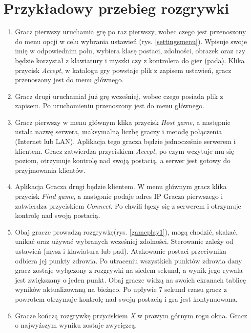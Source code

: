 \documentclass[multip]{SGGW-thesis}
\begin{document}
\chapter{Przykładowy przebieg rozgrywki} %

\begin{enumerate}
	\item Gracz pierwszy uruchamia grę po raz pierwszy, wobec czego jest przenoszony do menu opcji w celu wybrania ustawień (rys. \ref{settingsmenu}). Wpisuje swoje imię w odpowiednim polu, wybiera klasę postaci, zdolności, obrazek oraz czy będzie korzystał z klawiatury i myszki czy z kontrolera do gier (pada). Klika przycisk {\em Accept}, w katalogu gry powstaje plik z zapisem ustawień, gracz przenoszony jest do menu głównego.
	\item Gracz drugi uruchamiał już grę wcześniej, wobec czego posiada plik z zapisem. Po uruchomieniu przenoszony jest do menu głównego.
\item Gracz pierwszy w menu głównym klika przycisk {\em Host game}, a następnie ustala nazwę serwera, maksymalną liczbę graczy i metodę połączenia (Internet lub LAN). Aplikacja tego gracza będzie jednocześnie serwerem i klientem. Gracz zatwierdza przyciskiem {\em Accept}, po czym wczytuje mu się poziom, otrzymuje kontrolę nad swoją postacią, a serwer jest gotowy do przyjmowania klientów.
	\item Aplikacja Gracza drugi będzie klientem. W menu głównym gracz klika przycisk {\em Find game}, a następnie podaje adres IP Gracza pierwszego i zatwierdza przyciskiem {\em Connect}. Po chwili łączy się z serwerem i otrzymuje kontrolę nad swoją postacią.
	\item Obaj gracze prowadzą rozgrywkę(rys. \ref{gameplay1}), mogą chodzić, skakać, unikać oraz używać wybranych wcześniej zdolności. Sterowanie zależy od ustawień (mysz i klawiatura lub pad). Atakowanie postaci przeciwnika odbiera jej punkty zdrowia. Po utraceniu wszystkich punktów zdrowia dany gracz zostaje wyłączony z rozgrywki na siedem sekund, a wynik jego rywala jest zwiększany o jeden punkt. Obaj gracze widzą na swoich ekranach tablicę wyników aktualizowaną na bieżąco. Po upływie 7 sekund czasu gracz z powrotem otrzymuje kontrolę nad swoją postacią i gra jest kontynuowana.
	\item Gracze kończą rozgrywkę przyciskiem {\em X} w prawym górnym rogu okna. Gracz o najwyższym wyniku zostaje zwycięzcą.
\end{enumerate}
\end{document}
